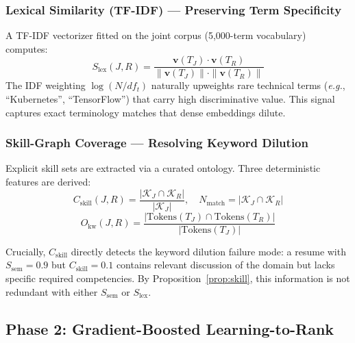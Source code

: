 \documentclass{svproc}
\begin{document}
\subsubsection{Lexical Similarity (TF-IDF) --- Preserving Term Specificity}
A TF-IDF vectorizer fitted on the joint corpus (5,000-term vocabulary) computes:
\begin{equation}
    S_{\mathrm{lex}}(J, R) = \frac{\mathbf{v}(T_J) \cdot \mathbf{v}(T_R)}{\|\mathbf{v}(T_J)\| \cdot \|\mathbf{v}(T_R)\|}
\end{equation}
The IDF weighting $\log(N/df_t)$ naturally upweights rare technical terms (\textit{e.g.}, ``Kubernetes'', ``TensorFlow'') that carry high discriminative value. This signal captures exact terminology matches that dense embeddings dilute.

\subsubsection{Skill-Graph Coverage --- Resolving Keyword Dilution}
Explicit skill sets are extracted via a curated ontology. Three deterministic features are derived:
\begin{equation}
    C_{\mathrm{skill}}(J, R) = \frac{|\mathcal{K}_J \cap \mathcal{K}_R|}{|\mathcal{K}_J|}, \quad
    N_{\mathrm{match}} = |\mathcal{K}_J \cap \mathcal{K}_R|
\end{equation}
\begin{equation}
    O_{\mathrm{kw}}(J, R) = \frac{|\mathrm{Tokens}(T_J) \cap \mathrm{Tokens}(T_R)|}{|\mathrm{Tokens}(T_J)|}
\end{equation}

Crucially, $C_\text{skill}$ directly detects the keyword dilution failure mode: a resume with $S_\text{sem} = 0.9$ but $C_\text{skill} = 0.1$ contains relevant discussion of the domain but lacks specific required competencies. By Proposition~\ref{prop:skill}, this information is not redundant with either $S_\text{sem}$ or $S_\text{lex}$.

\subsection{Phase 2: Gradient-Boosted Learning-to-Rank}
\end{document}
